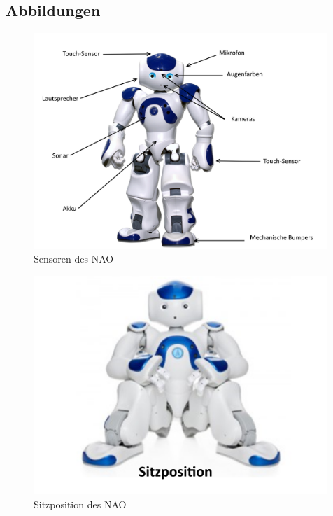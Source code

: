 \begin{appendix}

    \chapter{Abbildungen}

        \begin{figure}[ht]
            \centering
            \includegraphics[width=0.99\textwidth]{src/pictures/nao-sensors.png}
            \caption{Sensoren des NAO}
            \label{img:nao:sensors}
        \end{figure}

        \begin{figure}[ht]
            \centering
            \includegraphics[width=0.99\textwidth]{src/pictures/nao-sitting.png}
            \caption{Sitzposition des NAO}
            \label{img:nao:sitting}
        \end{figure}


\end{appendix}
